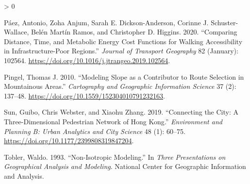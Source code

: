 \documentclass{article}
\newlength{\cslhangindent}
\newenvironment{CSLReferences}[2] %
 {%
  \setlength{\parindent}{0pt}
  \ifodd #1 \everypar{\setlength{\hangindent}{\cslhangindent}}\ignorespaces\fi
  \ifnum #2 > 0
  \setlength{\parskip}{#2\baselineskip}
  \fi
 }%
 {}
\begin{document}
\begin{CSLReferences}{1}{0}
\leavevmode\hypertarget{ref-paez2020}{}%
Páez, Antonio, Zoha Anjum, Sarah E. Dickson-Anderson, Corinne J.
Schuster-Wallace, Belén Martín Ramos, and Christopher D. Higgins. 2020.
{``Comparing Distance, Time, and Metabolic Energy Cost Functions for
Walking Accessibility in Infrastructure-Poor Regions.''} \emph{Journal
of Transport Geography} 82 (January): 102564.
\url{https://doi.org/10.1016/j.jtrangeo.2019.102564}.

\leavevmode\hypertarget{ref-pingel2010}{}%
Pingel, Thomas J. 2010. {``Modeling Slope as a Contributor to Route
Selection in Mountainous Areas.''} \emph{Cartography and Geographic
Information Science} 37 (2): 137--48.
\url{https://doi.org/10.1559/152304010791232163}.

\leavevmode\hypertarget{ref-sun2019}{}%
Sun, Guibo, Chris Webster, and Xiaohu Zhang. 2019. {``Connecting the
City: A Three-Dimensional Pedestrian Network of Hong Kong.''}
\emph{Environment and Planning B: Urban Analytics and City Science} 48
(1): 60--75. \url{https://doi.org/10.1177/2399808319847204}.

\leavevmode\hypertarget{ref-tobler1993}{}%
Tobler, Waldo. 1993. {``Non-Isotropic Modeling.''} In \emph{Three
Presentations on Geographical Analysis and Modeling}. {National Center
for Geographic Information and Analysis}.

\end{CSLReferences}



\end{document}
